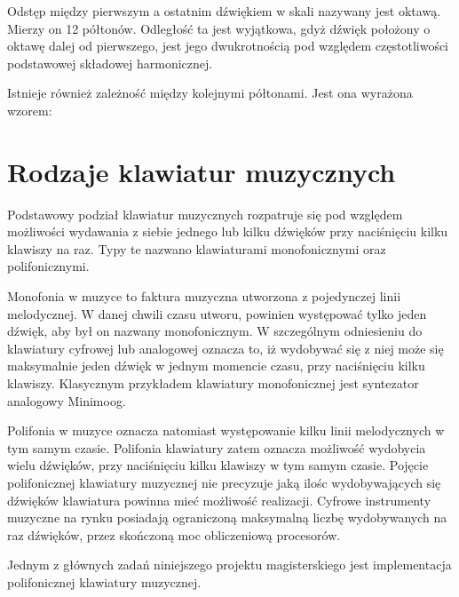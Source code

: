Odstęp między pierwszym a ostatnim dźwiękiem w skali nazywany jest oktawą. Mierzy on 12 półtonów. Odległość ta jest wyjątkowa, gdyż dźwięk położony o oktawę dalej od pierwszego, jest jego dwukrotnością pod względem częstotliwości podstawowej składowej harmonicznej.

Istnieje również zależność między kolejnymi półtonami. Jest ona wyrażona wzorem:



\section{Rodzaje klawiatur muzycznych}
Podstawowy podział klawiatur muzycznych rozpatruje się pod względem możliwości wydawania z siebie jednego lub kilku dźwięków przy naciśnięciu kilku klawiszy na raz. Typy te nazwano klawiaturami monofonicznymi oraz polifonicznymi.


Monofonia w muzyce to faktura muzyczna utworzona z pojedynczej linii melodycznej. W danej chwili czasu utworu, powinien występować tylko jeden dźwięk, aby był on nazwany monofonicznym. W szczególnym odniesieniu do klawiatury cyfrowej lub analogowej oznacza to, iż wydobywać się z niej może się maksymalnie jeden dźwięk w jednym momencie czasu, przy naciśnięciu kilku klawiszy. Klasycznym przykładem klawiatury monofonicznej jest syntezator analogowy Minimoog.


Polifonia w muzyce oznacza natomiast występowanie kilku linii melodycznych w tym samym czasie. Polifonia klawiatury zatem oznacza możliwość wydobycia wielu dźwięków, przy naciśnięciu kilku klawiszy w tym samym czasie. Pojęcie polifonicznej klawiatury muzycznej nie precyzuje jaką ilośc wydobywających się dźwięków klawiatura powinna mieć możliwość realizacji. Cyfrowe instrumenty muzyczne na rynku posiadają ograniczoną maksymalną liczbę wydobywanych na raz dźwięków, przez skończoną moc obliczeniową procesorów.

%
%

Jednym z głównych zadań niniejszego projektu magisterskiego jest implementacja polifonicznej klawiatury muzycznej.

